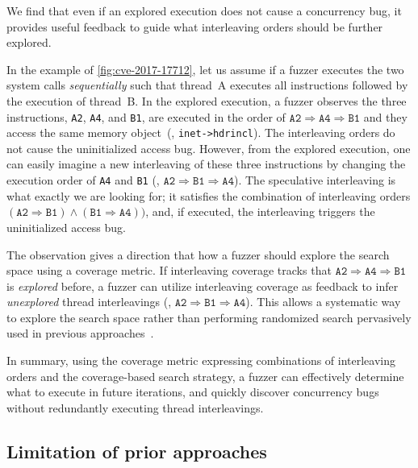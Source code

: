 %
We find that even if an explored execution does not cause 
a concurrency bug, it provides useful feedback 
to guide what interleaving orders should be further explored.

In the example of \autoref{fig:cve-2017-17712}, let us assume 
if a fuzzer executes the two system calls \textit{sequentially} 
such that thread~A executes all instructions followed by the execution of thread~B. 
In the explored execution, a fuzzer observes the three
instructions, \texttt{A2}, \texttt{A4}, and \texttt{B1}, are executed
in the order of
$\texttt{A2} \Rightarrow \texttt{A4} \Rightarrow \texttt{B1}$ and
they access the same memory object~(\ie, \texttt{inet->hdrincl}).
%
The interleaving orders do not cause the uninitialized access bug.
%
However, from the explored execution, one can easily imagine a new interleaving of these three
instructions by changing the execution order of \texttt{A4} and
\texttt{B1} (\ie,
$\texttt{A2} \Rightarrow \texttt{B1} \Rightarrow \texttt{A4}$).
%
The speculative interleaving is what exactly we are looking for; it
satisfies the combination of interleaving orders
$(\texttt{A2} \Rightarrow \texttt{B1}) \wedge (\texttt{B1} \Rightarrow
\texttt{A4}))$, and, if executed, the interleaving triggers the
uninitialized access bug.

The observation gives a direction that how a fuzzer should explore 
the search space using a coverage metric.
If interleaving coverage tracks that
$\texttt{A2} \Rightarrow \texttt{A4} \Rightarrow \texttt{B1}$ is
\textit{explored} before, a fuzzer can utilize interleaving
coverage as feedback to infer \textit{unexplored} thread interleavings (\eg,
$\texttt{A2} \Rightarrow \texttt{B1} \Rightarrow \texttt{A4}$). 
This allows a systematic way to explore the search space rather than 
performing randomized search pervasively used in previous approaches~\cite{ski, krace, pctalgorithm, muzz}.%

In summary, using the coverage metric expressing combinations of interleaving orders and the coverage-based search strategy, a fuzzer can effectively determine what to execute in future iterations, and quickly discover concurrency bugs
without redundantly executing thread interleavings.

\subsection{Limitation of prior approaches}
\label{ss:existingapproaches}
%
%   

